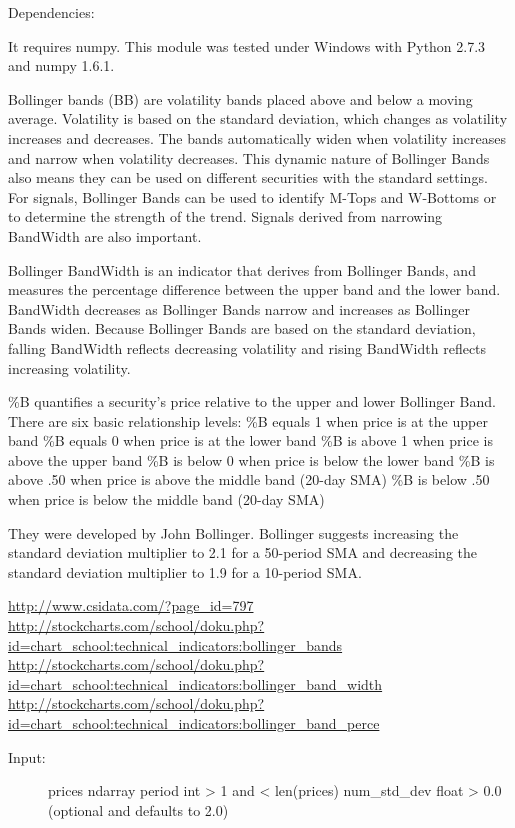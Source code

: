 \documentclass[letterpaper,10pt,english]{sphinxmanual}
\begin{document}
Dependencies:

It requires numpy.
This module was tested under Windows with Python 2.7.3 and numpy 1.6.1.

\begin{fulllineitems}
\label{reference:technical_indicators.technical_indicators.bb}
Bollinger bands (BB) are volatility bands placed above and below a moving
average.
Volatility is based on the standard deviation, which changes as volatility
increases and decreases.
The bands automatically widen when volatility increases and narrow when
volatility decreases.
This dynamic nature of Bollinger Bands also means they can be used on
different securities with the standard settings.
For signals, Bollinger Bands can be used to identify M-Tops and W-Bottoms
or to determine the strength of the trend.
Signals derived from narrowing BandWidth are also important.

Bollinger BandWidth is an indicator that derives from Bollinger Bands, and
measures the percentage difference between the upper band and the lower
band.
BandWidth decreases as Bollinger Bands narrow and increases as Bollinger
Bands widen.
Because Bollinger Bands are based on the standard deviation, falling
BandWidth reflects decreasing volatility and rising BandWidth reflects
increasing volatility.

\%B quantifies a security's price relative to the upper and lower Bollinger
Band. There are six basic relationship levels:
\%B equals 1 when price is at the upper band
\%B equals 0 when price is at the lower band
\%B is above 1 when price is above the upper band
\%B is below 0 when price is below the lower band
\%B is above .50 when price is above the middle band (20-day SMA)
\%B is below .50 when price is below the middle band (20-day SMA)

They were developed by John Bollinger.
Bollinger suggests increasing the standard deviation multiplier to 2.1 for
a 50-period SMA and decreasing the standard deviation multiplier to 1.9 for
a 10-period SMA.

\href{http://www.csidata.com/?page\_id=797}{http://www.csidata.com/?page\_id=797}
\href{http://stockcharts.com/school/doku.php?id=chart\_school:technical\_indicators:bollinger\_bands}{http://stockcharts.com/school/doku.php?id=chart\_school:technical\_indicators:bollinger\_bands}
\href{http://stockcharts.com/school/doku.php?id=chart\_school:technical\_indicators:bollinger\_band\_width}{http://stockcharts.com/school/doku.php?id=chart\_school:technical\_indicators:bollinger\_band\_width}
\href{http://stockcharts.com/school/doku.php?id=chart\_school:technical\_indicators:bollinger\_band\_perce}{http://stockcharts.com/school/doku.php?id=chart\_school:technical\_indicators:bollinger\_band\_perce}
\begin{description}
\item[{Input:}] \leavevmode
prices ndarray
period int \textgreater{} 1 and \textless{} len(prices)
num\_std\_dev float \textgreater{} 0.0 (optional and defaults to 2.0)


\end{description}
\end{fulllineitems}
\end{document}
